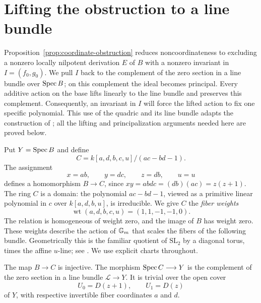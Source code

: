 \section{Lifting the obstruction to a line bundle}\label{sec:bundle}

Proposition~\ref{prop:coordinate-obstruction} reduces noncoordinateness to
excluding a nonzero locally nilpotent derivation $E$ of $B$ with a nonzero
invariant in $I=(f_0,g_0)$.  We pull $I$ back to the complement of the zero
section in a line bundle over $\operatorname{Spec} B$; on this complement the ideal
becomes principal.  Every additive action on the base lifts linearly to
the line bundle and preserves this complement.  Consequently, an invariant
in $I$ will force the lifted action to fix one specific polynomial.  This use of the quadric and its line bundle
adapts the construction of \cite[Sections~4--6]{Cancellation2026}; all the
lifting and principalization arguments needed here are proved below.

Put $Y=\operatorname{Spec} B$ and define
\begin{equation}\label{bun:C}
 C=k[a,d,b,c,u]/(ac-bd-1).
\end{equation}
The assignment
\begin{equation}\label{bun:base-map}
 x=ab,\qquad y=dc,\qquad z=db,\qquad u=u
\end{equation}
defines a homomorphism $B\longrightarrow C$, since
$xy=abdc=(db)(ac)=z(z+1)$.  The ring $C$ is a domain: the polynomial
$ac-bd-1$, viewed as a primitive linear polynomial in $c$ over
$k[a,d,b,u]$, is irreducible.  We give $C$ the \emph{fiber weights}
\begin{equation}\label{bun:fiber-weights}
 \operatorname{wt}(a,d,b,c,u)=(1,1,-1,-1,0).
\end{equation}
The relation is homogeneous of weight zero, and the image of $B$ has weight
zero.  These weights describe the action of $\mathbb G_m$ that scales the fibers
of the following bundle.  Geometrically this is the familiar quotient of
$\mathrm{SL}_2$ by a diagonal torus, times the affine $u$-line; see
\cite[p.~8431]{BlancVanSanten2019}.  We use explicit charts throughout.

\begin{lemma}\label{bun:charts}
The map $B\longrightarrow C$ is injective.  The morphism
$\operatorname{Spec} C\longrightarrow Y$ is the complement of the zero section in a line
bundle $\mathcal L\longrightarrow Y$.  It is trivial over the open cover
\[
 U_0=D(z+1),\qquad U_1=D(z)
\]
of $Y$, with respective invertible fiber coordinates $a$ and $d$.
\end{lemma}

